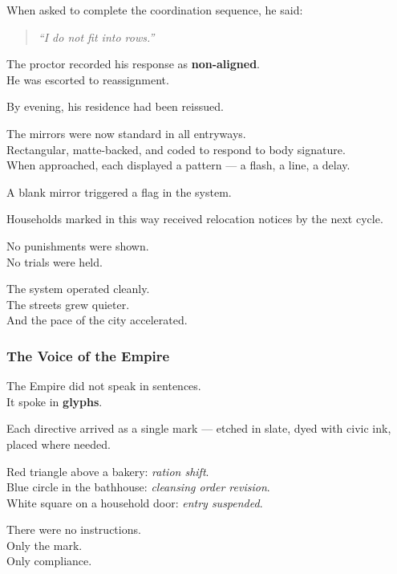 \documentclass[12pt]{article}
\begin{document}
When asked to complete the coordination sequence, he said:

\begin{quote}
\textit{“I do not fit into rows.”}
\end{quote}

The proctor recorded his response as \textbf{non-aligned}.\\
He was escorted to reassignment.

By evening, his residence had been reissued.

\vspace{1em}

The mirrors were now standard in all entryways.\\
Rectangular, matte-backed, and coded to respond to body signature.\\
When approached, each displayed a pattern — a flash, a line, a delay.

A blank mirror triggered a flag in the system.

Households marked in this way received relocation notices by the next cycle.

\vspace{1em}

No punishments were shown.\\
No trials were held.

The system operated cleanly.\\
The streets grew quieter.\\
And the pace of the city accelerated.


\dotfill

\subsubsection*{The Voice of the Empire}

The Empire did not speak in sentences.\\
It spoke in \textbf{glyphs}.

Each directive arrived as a single mark — etched in slate, dyed with civic ink, placed where needed.

Red triangle above a bakery: \textit{ration shift}.\\
Blue circle in the bathhouse: \textit{cleansing order revision}.\\
White square on a household door: \textit{entry suspended}.

There were no instructions.\\
Only the mark.\\
Only compliance.
\end{document}
